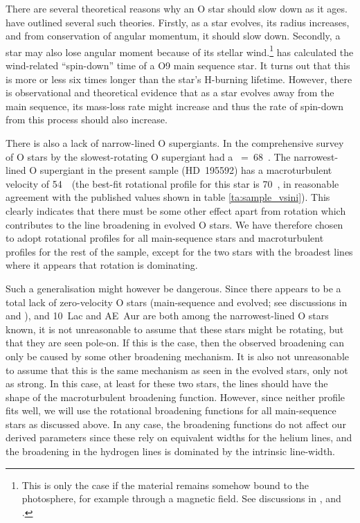 There are several theoretical reasons why an O star should slow down
as it ages.  have outlined several such
theories. Firstly, as a star evolves, its radius increases, and from
conservation of angular momentum, it should slow down. Secondly, a
star may also lose angular moment because of its stellar
wind.\footnote{This is only the case if the material remains somehow
bound to the photosphere, for example through a magnetic field. See
discussions in ,  and .}
 has calculated the wind-related ``spin-down'' time
of a O9 main sequence star. It turns out that this is more or less six
times longer than the star's H-burning lifetime. However, there is
observational and theoretical evidence that as a star evolves away
from the main sequence, its mass-loss rate might increase and thus the
rate of spin-down from this process should also increase.

There is also a lack of narrow-lined O supergiants. In the
comprehensive survey of O stars by  the
slowest-rotating O supergiant had a \vsini~=~68~\kms. The
narrowest-lined O supergiant in the present sample (HD~195592) has a
macroturbulent velocity of 54~\kms\ (the best-fit rotational profile
for this star is 70~\kms, in reasonable agreement with the published
values shown in table \ref{ta:sample_vsini}). This clearly indicates
that there must be some other effect apart from rotation which
contributes to the line broadening in evolved O stars. We have
therefore chosen to adopt rotational profiles for all main-sequence
stars and macroturbulent profiles for the rest of the sample, except
for the two stars with the broadest lines where it appears that rotation
is dominating. 

Such a generalisation might however be dangerous. Since there appears
to be a total lack of zero-velocity O stars (main-sequence and
evolved; see discussions in \cite{pe:xcorr} and ), and
10~Lac and AE~Aur are both among the narrowest-lined O stars known, it
is not unreasonable to assume that these stars might be rotating, but
that they are seen pole-on. If this is the case, then the observed
broadening can only be caused by some other broadening mechanism. It
is also not unreasonable to assume that this is the same mechanism as
seen in the evolved stars, only not as strong. In this case, at least
for these two stars, the lines should have the shape of the
macroturbulent broadening function. However, since neither profile
fits well, we will use the rotational broadening functions for all
main-sequence stars as discussed above. In any case, the broadening
functions do not affect our derived parameters since these rely on
equivalent widths for the helium lines, and the broadening in the
hydrogen lines is dominated by the intrinsic line-width.


